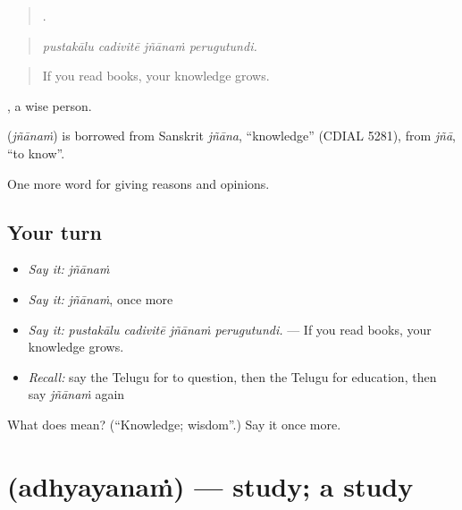 \begin{quote}
   .
\end{quote}

\begin{quote}
\emph{pustakālu cadivitē jñānaṁ perugutundi.}
\end{quote}

\begin{quote}
If you read books, your knowledge grows.
\end{quote}

, a wise person.

\begin{cousinweb}
\textbf{} (\emph{jñānaṁ}) is borrowed from Sanskrit \emph{jñāna}, \textquotedblleft{}knowledge\textquotedblright{} (CDIAL 5281), from \emph{jñā}, \textquotedblleft{}to know\textquotedblright{}.
\end{cousinweb}

\begin{grammarlens}[title={What you've built}]
One more word for giving reasons and opinions.
\end{grammarlens}

\subsection*{Your turn}
\begin{itemize}
\raggedright
  \item \emph{Say it:} \emph{jñānaṁ}
  \item \emph{Say it:} \emph{jñānaṁ}, once more
  \item \emph{Say it:} \emph{pustakālu cadivitē jñānaṁ perugutundi.} — If you read books, your knowledge grows.
  \item \emph{Recall:} say the Telugu for to question, then the Telugu for education, then say \emph{jñānaṁ} again
\end{itemize}

\begin{tcolorbox}[breakable,colback=teal!4,colframe=teal!35!black,title={Before you move on}]
What does  mean? (\textquotedblleft{}Knowledge; wisdom\textquotedblright{}.) Say it once more.
\end{tcolorbox}
\section[\texorpdfstring{\te{అధ్యయనం} (adhyayanaṁ)}{అధ్యయనం (adhyayanaṁ)}]{ (adhyayanaṁ) — study; a study}

